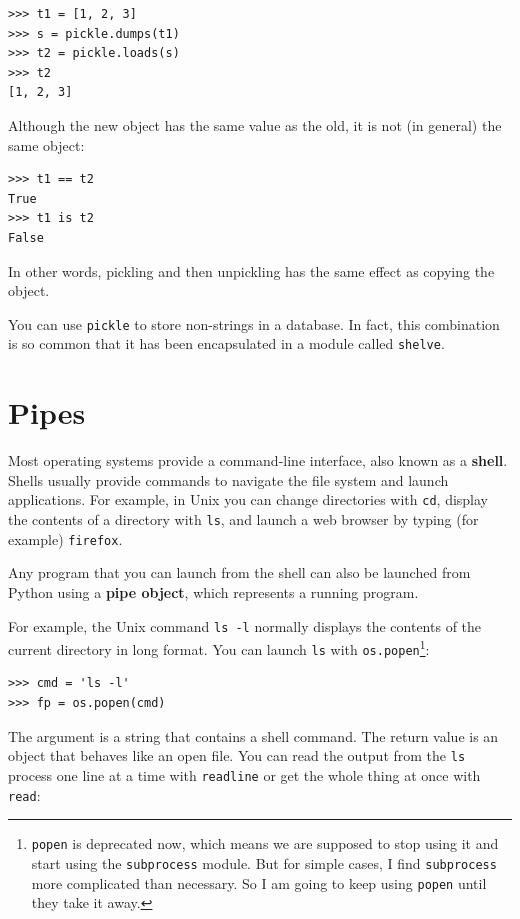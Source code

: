 \documentclass[10pt]{book}
\begin{document}
\begin{verbatim}
>>> t1 = [1, 2, 3]
>>> s = pickle.dumps(t1)
>>> t2 = pickle.loads(s)
>>> t2
[1, 2, 3]
\end{verbatim}
%
Although the new object has the same value as the old, it is
not (in general) the same object:

\begin{verbatim}
>>> t1 == t2
True
>>> t1 is t2
False
\end{verbatim}
%
In other words, pickling and then unpickling has the same effect
as copying the object.

You can use {\tt pickle} to store non-strings in a database.
In fact, this combination is so common that it has been
encapsulated in a module called {\tt shelve}.  


\section{Pipes}

Most operating systems provide a command-line interface,
also known as a {\bf shell}.  Shells usually provide commands
to navigate the file system and launch applications.  For
example, in Unix you can change directories with {\tt cd},
display the contents of a directory with {\tt ls}, and launch
a web browser by typing (for example) {\tt firefox}.

Any program that you can launch from the shell can also be
launched from Python using a {\bf pipe object}, which
represents a running program.

For example, the Unix command {\tt ls -l} normally displays the
contents of the current directory in long format.  You can
launch {\tt ls} with {\tt os.popen}\footnote{{\tt popen} is deprecated
now, which means we are supposed to stop using it and start using
the {\tt subprocess} module.  But for simple cases, I find
{\tt subprocess} more complicated than necessary.  So I am going
to keep using {\tt popen} until they take it away.}:

\begin{verbatim}
>>> cmd = 'ls -l'
>>> fp = os.popen(cmd)
\end{verbatim}
%
The argument is a string that contains a shell command.  The
return value is an object that behaves like an open
file.  You can read the output from the {\tt ls} process one
line at a time with {\tt readline} or get the whole thing at
once with {\tt read}:
\end{document}
